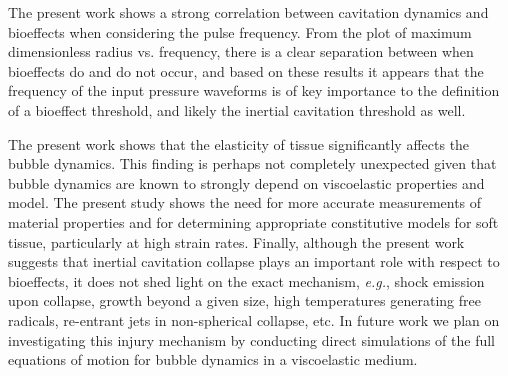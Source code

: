 The present work shows a strong correlation between cavitation
dynamics and bioeffects when considering the pulse frequency.  From
the plot of maximum dimensionless radius vs. frequency, there is a
clear separation between when bioeffects do and do not occur, and
based on these results it appears that the frequency of the input
pressure waveforms is of key importance to the definition of a
bioeffect threshold, and likely the inertial cavitation threshold as
well.

The present work shows that the elasticity of tissue significantly
affects the bubble dynamics. This finding is perhaps not completely
unexpected given that bubble dynamics are known to strongly depend on
viscoelastic properties and model. The present study shows the need
for more accurate measurements of material properties and for
determining appropriate constitutive models for soft tissue,
particularly at high strain rates. Finally, although the present work
suggests that inertial cavitation collapse plays an important role
with respect to bioeffects, it does not shed light on the exact
mechanism, \emph{e.g.}, shock emission upon collapse, growth beyond a
given size, high temperatures generating free radicals, re-entrant
jets in non-spherical collapse, etc.  In future work we plan on
investigating this injury mechanism by conducting direct simulations
of the full equations of motion for bubble dynamics in a viscoelastic
medium.

































